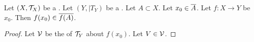\begin{prop}
\label{prop:ContinuityAtAPoint:Closure}
Let $(X, \mathcal{T}_X)$ be a \TopologicalSpace. 
Let $(Y, |T_Y)$ be a \TopologicalSpace. 
Let $A \subset X$. 
Let $x_0 \in \overline{A}$.
Let $f:X \to Y$ be 
\ContinuousAt $x_0$. 
Then $f(x_0) \in \overline{f(A)}$. 
\begin{proof}
Let $\mathcal{V}$ be the \NeighborhoodFilter 
of $\mathcal{T}_Y$ about $f(x_0)$. 
Let $V \in \mathcal{V}$. 


\end{proof}
\end{prop}
